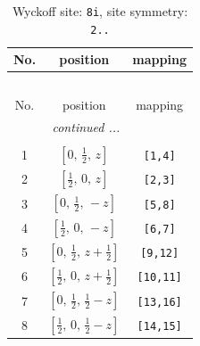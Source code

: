 \documentclass[fleqn,8pt]{jsarticle}
\begin{document}
\renewcommand{\arraystretch}{1.2}
\begin{longtable}{ccc}
\caption{Wyckoff site: {\tt 8i}, site symmetry: {\tt 2..}}
 \\
 \hline \hline
No. & position & mapping \\ \hline \endfirsthead

\multicolumn{2}{l}{\tablename\ \thetable{}} \\
 \hline \hline
No. & position & mapping \\ \hline \endhead

 \hline \hline
\multicolumn{2}{r}{\footnotesize\it continued ...} \\ \endfoot

 \hline \hline
\multicolumn{2}{r}{} \\ \endlastfoot

1 & $\left[ 0,\, \frac{1}{2},\, z \right]$ & {\tt [1,4]} \\ \hline
2 & $\left[ \frac{1}{2},\, 0,\, z \right]$ & {\tt [2,3]} \\ \hline
3 & $\left[ 0,\, \frac{1}{2},\, - z \right]$ & {\tt [5,8]} \\ \hline
4 & $\left[ \frac{1}{2},\, 0,\, - z \right]$ & {\tt [6,7]} \\ \hline
5 & $\left[ 0,\, \frac{1}{2},\, z + \frac{1}{2} \right]$ & {\tt [9,12]} \\ \hline
6 & $\left[ \frac{1}{2},\, 0,\, z + \frac{1}{2} \right]$ & {\tt [10,11]} \\ \hline
7 & $\left[ 0,\, \frac{1}{2},\, \frac{1}{2} - z \right]$ & {\tt [13,16]} \\ \hline
8 & $\left[ \frac{1}{2},\, 0,\, \frac{1}{2} - z \right]$ & {\tt [14,15]} \\
\end{longtable}
\renewcommand{\arraystretch}{1.2}
\end{document}
